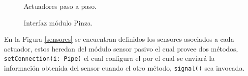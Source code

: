 \begin{figure}[H]
\caption{Actuadores paso a paso.}
\label{estructuraActuadores}
\begin{center}
\end{center}
\end{figure}


\begin{figure}[h!]
\caption{Interfaz módulo Pinza.}
\label{moduloPinza}
\begin{center}
\end{center}
\end{figure}

En la Figura \ref{sensores} se encuentran definidos los sensores asociados a cada actuador, estos heredan del módulo sensor pasivo el cual provee dos métodos, \verb|setConnection(i: Pipe)| el cual configura el \Pipe por el cual se enviará la información obtenida del sensor cuando el otro método, \verb|signal()| sea invocada.

